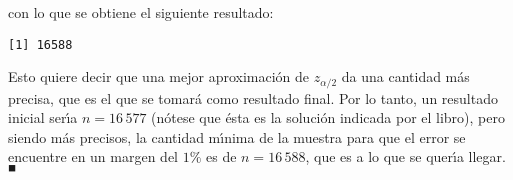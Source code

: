 \begin{solucion}
 \vspace{-0.5cm}
 con lo que se obtiene el siguiente resultado:
 \begin{verbatim}
[1] 16588
 \end{verbatim}
 \vspace{-0.5cm}
 Esto quiere decir que una mejor aproximaci\'on de $z_{\alpha/2}$ da una cantidad m\'as precisa, que es el que se tomar\'a como resultado final. Por lo tanto, un resultado inicial ser\'{\i}a $n = 16\,577$ (n\'otese que \'esta es la soluci\'on indicada por el libro), pero siendo m\'as precisos, la cantidad m\'{\i}nima de la muestra para que el error se encuentre en un margen del $1\%$ es de $n = 16\,588$, que es a lo que se quer\'{\i}a llegar.${}_{\blacksquare}$
\end{solucion}
